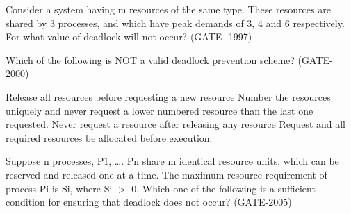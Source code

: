 \vspace{0.08in}

\begin{minipage}{\linewidth}

  \question  Consider a system having m resources of the same type. These resources are shared by 3 processes, and  which have peak demands of 3, 4 and 6 respectively.  For what value of deadlock will not occur? (GATE- 1997)

  \begin{oneparchoices}
  \end{oneparchoices}

  \end{minipage}

\vspace{0.08in}


\begin{minipage}{\linewidth}

  \question  Which of the following is NOT a valid deadlock prevention scheme? (GATE- 2000)

  \begin{choices}
    \choice Release all resources before requesting a new resource
    \choice Number the resources uniquely and never request a lower numbered resource than the last one requested.
    \choice Never request a resource after releasing any resource
    \choice Request and all required resources be allocated before execution.
  \end{choices}

  \end{minipage}

\vspace{0.08in}


\begin{minipage}{\linewidth}

  \question  Suppose n processes, P1, …. Pn share m identical resource units, which can be reserved and released one at a time. The maximum resource requirement of process Pi is Si, where Si \(>\) 0. Which one of the following is a sufficient condition for ensuring that deadlock does not occur? (GATE-2005)

  \begin{choices}
  \end{choices}

  \end{minipage}

